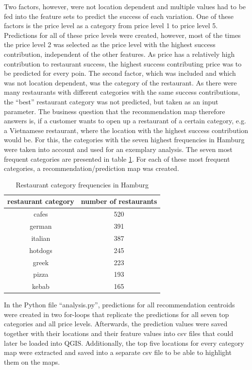 \documentclass[a4paper, 11pt, oneside]{Thesis}  %
\begin{document}
Two factors, however, were not location dependent and multiple values had to be fed into the feature sets to predict the success of each variation. One of these factors is the price level as a category from price level 1 to price level 5. Predictions for all of these price levels were created, however, most of the times the price level 2 was selected as the price level with the highest success contribution, independent of the other features. As price has a relatively high contribution to restaurant success, the highest success contributing price was to be predicted for every poin. The second factor, which was included and which was not location dependent, was the category of the restaurant. As there were many restaurants with different categories with the same success contributions, the ``best'' restaurant category was not predicted, but taken as an input parameter. The business question that the recommendation map therefore answers is, if a customer wants to open up a restaurant of a certain category, e.g. a Vietnamese restaurant, where the location with the highest success contribution would be. For this, the categories with the seven highest frequencies in Hamburg were taken into account and used for an exemplary analysis. The seven most frequent categories are presented in table \ref{table:category_frequencies}. For each of these most frequent categories, a recommendation/prediction map was created.

\begin{table}[h!]
\begin{center}
\begin{tabular}{| c | c |}
\hline
 restaurant category & number of restaurants \\
 \hline
 cafes & 520 \\ 
 german & 391 \\  
 italian & 387 \\    
 hotdogs & 245 \\
 greek & 223 \\
 pizza & 193 \\
 kebab & 165 \\
 \hline
\end{tabular}
\caption{Restaurant category frequencies in Hamburg}
\label{table:category_frequencies}
\end{center}
\end{table}

In the Python file ``analysis.py'', predictions for all recommendation centroids were created in two for-loops that replicate the predictions for all seven top categories and all price levels. Afterwards, the prediction values were saved together with their locations and their feature values into \ac{csv} files that could later be loaded into QGIS. Additionally, the top five locations for every category map were extracted and saved into a separate \ac{csv} file to be able to highlight them on the maps.
\end{document}
